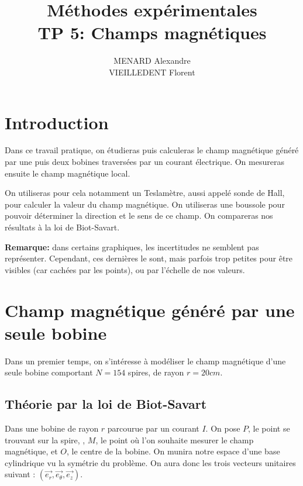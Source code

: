 \documentclass[12pt]{article}
\title{\textbf{Méthodes expérimentales} \\ TP 5: Champs magnétiques}
\author{MENARD Alexandre \\ VIEILLEDENT Florent}
\begin{document}
\maketitle

\section*{Introduction}

Dans ce travail pratique, on étudieras puis calculeras le champ magnétique généré par une puis deux bobines traversées par un courant électrique. On mesureras ensuite le champ magnétique local. 

On utiliseras pour cela notamment un Teslamètre, aussi appelé sonde de Hall, pour calculer la valeur du champ magnétique. On utiliseras une boussole pour pouvoir déterminer la direction et le sens de ce champ. On compareras nos résultats à la loi de Biot-Savart. 

\textbf{Remarque:} dans certains graphiques, les incertitudes ne semblent pas représenter. Cependant, ces dernières le sont, mais parfois
trop petites pour être visibles (car cachées par les points), ou par l'échelle de nos valeurs. 

\newpage
\section{Champ magnétique généré par une seule bobine}
Dans un premier temps, on s'intéresse à modéliser le champ magnétique d'une seule bobine comportant 
$N = 154$ spires, de rayon $r = 20cm$.

\subsection{Théorie par la loi de Biot-Savart}
Dans une bobine de rayon $r$ parcourue par un courant $I$. On pose $P$, le point se trouvant sur la spire,
, $M$, le point où l'on souhaite mesurer le champ magnétique, et $O$, le centre de la bobine. On munira notre espace d'une base cylindrique vu
la symétrie du problème. On aura donc les trois vecteurs unitaires suivant : $(\vec{e_r}, \vec{e_\theta}, \vec{e_z})$.
\end{document}
